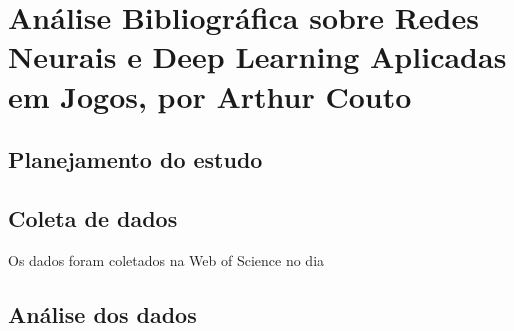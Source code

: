 \chapter{Análise Bibliográfica sobre Redes Neurais e Deep Learning Aplicadas em Jogos, por Arthur Couto\label{chap:bibliometria:CrimsonCrown}}

\section{Planejamento do estudo}

\section{Coleta de dados}
Os dados foram coletados na Web of Science no dia

\section{Análise dos dados}